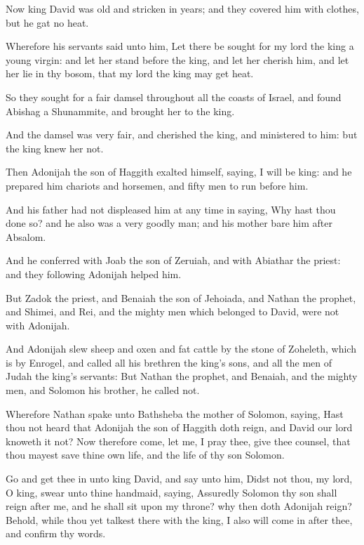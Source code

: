 \Chapter
\Verse Now king David was old and stricken in years; and they covered him with clothes, but he gat no heat.

\Verse Wherefore his servants said unto him, Let there be sought for my lord the king a young virgin: and let her stand before the king, and let her cherish him, and let her lie in thy bosom, that my lord the king may get heat.

\Verse So they sought for a fair damsel throughout all the coasts of Israel, and found Abishag a Shunammite, and brought her to the king.

\Verse And the damsel was very fair, and cherished the king, and ministered to him: but the king knew her not.

\Verse Then Adonijah the son of Haggith exalted himself, saying, I will be king: and he prepared him chariots and horsemen, and fifty men to run before him.

\Verse And his father had not displeased him at any time in saying, Why hast thou done so? and he also was a very goodly man; and his mother bare him after Absalom.

\Verse And he conferred with Joab the son of Zeruiah, and with Abiathar the priest: and they following Adonijah helped him.

\Verse But Zadok the priest, and Benaiah the son of Jehoiada, and Nathan the prophet, and Shimei, and Rei, and the mighty men which belonged to David, were not with Adonijah.

\Verse And Adonijah slew sheep and oxen and fat cattle by the stone of Zoheleth, which is by Enrogel, and called all his brethren the king's sons, and all the men of Judah the king's servants: \Verse But Nathan the prophet, and Benaiah, and the mighty men, and Solomon his brother, he called not.

\Verse Wherefore Nathan spake unto Bathsheba the mother of Solomon, saying, Hast thou not heard that Adonijah the son of Haggith doth reign, and David our lord knoweth it not?  \Verse Now therefore come, let me, I pray thee, give thee counsel, that thou mayest save thine own life, and the life of thy son Solomon.

\Verse Go and get thee in unto king David, and say unto him, Didst not thou, my lord, O king, swear unto thine handmaid, saying, Assuredly Solomon thy son shall reign after me, and he shall sit upon my throne?  why then doth Adonijah reign?  \Verse Behold, while thou yet talkest there with the king, I also will come in after thee, and confirm thy words.

